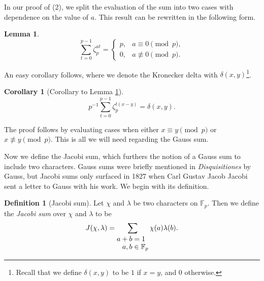 \documentclass[10pt]{amsart}
\theoremstyle{plain}
\newtheorem{lemma}[thm]{Lemma}
\newtheorem{cor}[thm]{Corollary}
\theoremstyle{definition}
\newtheorem{defn}{Definition}
\theoremstyle{remark}
\numberwithin{equation}{section}
\begin{document}
In our proof of (2), we split the evaluation of the sum into two cases with dependence on the value of $a$. This result can be rewritten in the following form. 
\begin{lemma} \label{Lemma: result about zeta from special property prop about Gauss sums about zeta from special property prop about Gauss sums}
    \begin{equation*}
        \sum_{t=0}^{p-1}\zeta_{p}^{at} = \left\{ \begin{array}{ll}
            p, & a\equiv 0\pmod{p}, \\
            0, & a\not\equiv 0\pmod{p}.
        \end{array}
        \right.
    \end{equation*}
\end{lemma}

An easy corollary follows, where we denote the Kronecker delta with $\delta(x,y)$\footnote{Recall that we define $\delta(x,y)$ to be $1$ if $x=y$, and $0$ otherwise.}.

\begin{cor}[Corollary to Lemma \ref{Lemma: result about zeta from special property prop about Gauss sums about zeta from special property prop about Gauss sums}]\label{corollary to Lemma 3.7}
    \begin{equation*}
     p^{-1}\sum_{t=0}^{p-1}\zeta_{p}^{t(x-y)}  = \delta(x,y).
\end{equation*}
\end{cor}

The proof follows by evaluating cases when either $x\equiv y\pmod{p}$ or $x\not\equiv y\pmod{p}$. This is all we will need regarding the Gauss sum. 

\indent Now we define the Jacobi sum, which furthers the notion of a Gauss sum to include two characters. Gauss sums were briefly mentioned in \textit{Disquisitiones} by Gauss, but Jacobi sums only surfaced in 1827 when Carl Gustav Jacob Jacobi sent a letter to Gauss with his work. We begin with its definition. 
\begin{defn}[Jacobi sum]
    Let $\chi$ and $\lambda$ be two characters on $\mathbb{F}_{p}$. Then we define the \textit{Jacobi sum} over $\chi$ and $\lambda$ to be
    \begin{equation*}
        J(\chi,\lambda) = \sum_{\scriptsize\begin{aligned}a+b&=1 \\[-4pt] a,b &\in \mathbb{F}_{p}\end{aligned}}\chi(a)\lambda(b).
    \end{equation*}
\end{defn}
\end{document}
